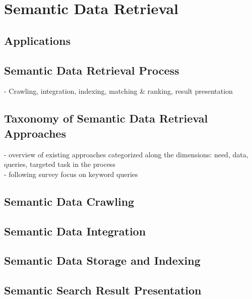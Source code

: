 \section{Semantic Data Retrieval}
\subsection{Applications} 
\subsection{Semantic Data Retrieval Process} 
- Crawling, integration, indexing, matching \& ranking, result presentation \\

\subsection{Taxonomy of Semantic Data Retrieval Approaches}
- overview of existing approaches categorized along the dimensions: need, data, queries, targeted task in the process \\
- following survey focus on keyword queries  \\


\subsection{Semantic Data Crawling} 
\subsection{Semantic Data Integration}
\subsection{Semantic Data Storage and Indexing}
\subsection{Semantic Search Result Presentation}

 
